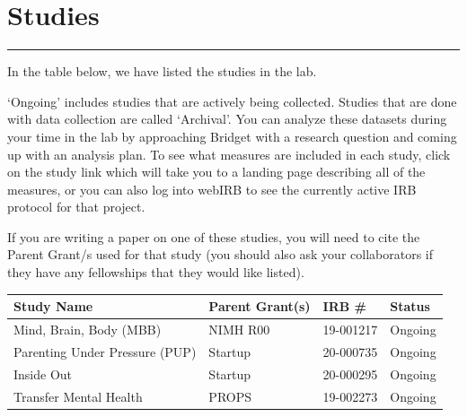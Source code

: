 \documentclass[]{book}
\begin{document}
\hypertarget{studies}{%
\chapter{Studies}\label{studies}}

\begin{center}\rule{0.5\linewidth}{0.5pt}\end{center}

In the table below, we have listed the studies in the lab.

`Ongoing' includes studies that are actively being collected. Studies that are done with data collection are called `Archival'. You can analyze these datasets during your time in the lab by approaching Bridget with a research question and coming up with an analysis plan. To see what measures are included in each study, click on the study link which will take you to a landing page describing all of the measures, or you can also log into webIRB to see the currently active IRB protocol for that project.

If you are writing a paper on one of these studies, you will need to cite the Parent Grant/s used for that study (you should also ask your collaborators if they have any fellowships that they would like listed).

\begin{longtable}[]{@{}llll@{}}
\toprule
Study Name & Parent Grant(s) & IRB \# & Status\tabularnewline
\midrule
\endhead
Mind, Brain, Body (MBB) & NIMH R00 & 19-001217 & Ongoing\tabularnewline
Parenting Under Pressure (PUP) & Startup & 20-000735 & Ongoing\tabularnewline
Inside Out & Startup & 20-000295 & Ongoing\tabularnewline
Transfer Mental Health & PROPS & 19-002273 & Ongoing\tabularnewline
\bottomrule
\end{longtable}


\end{document}
